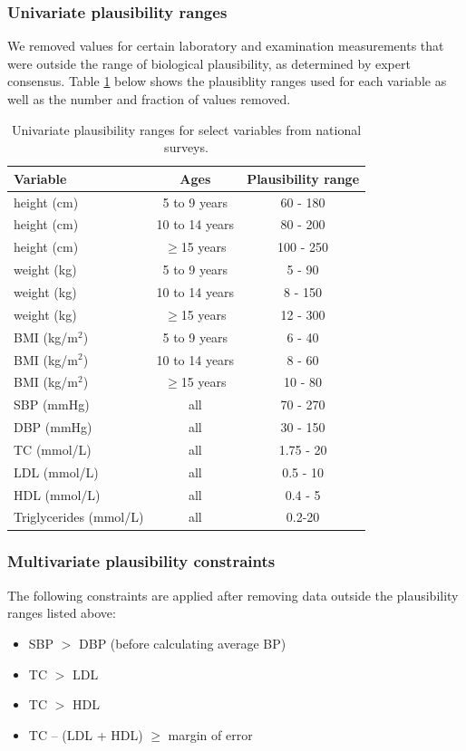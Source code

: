 \documentclass[12pt]{article}
\begin{document}
\begin{appendix}
    \subsubsection{Univariate plausibility ranges}
    We removed values for certain laboratory and examination measurements that were outside the range of biological plausibility, as determined by expert consensus. Table \ref{tab:plausibility} below shows the plausiblity ranges used for each variable as well as the number and fraction of values removed.

    \begin{table}[h]
        \centering
        \caption{Univariate plausibility ranges for select variables from national surveys.}
        \begin{tabular}{lcc}
            \hline
            Variable & Ages & Plausibility range \\
            \hline
            height (cm) & 5 to 9 years & 60 - 180 \\
            height (cm) & 10 to 14 years & 80 - 200 \\
            height (cm) & $\geq$15 years & 100 - 250 \\
            weight (kg) & 5 to 9 years & 5 - 90 \\
            weight (kg) & 10 to 14 years & 8 - 150 \\
            weight (kg) & $\geq$15 years & 12 - 300 \\
            BMI (kg/m$^2$) & 5 to 9 years & 6 - 40 \\
            BMI (kg/m$^2$) & 10 to 14 years & 8 - 60 \\
            BMI (kg/m$^2$) & $\geq$15 years & 10 - 80 \\
            SBP (mmHg) & all & 70 - 270 \\
            DBP (mmHg) & all & 30 - 150 \\
            TC (mmol/L) & all & 1.75 - 20 \\
            LDL (mmol/L) & all & 0.5 - 10 \\
            HDL (mmol/L) & all & 0.4 - 5 \\
            Triglycerides (mmol/L) & all & 0.2-20 \\
            \hline
        \end{tabular}
        \label{tab:plausibility}
    \end{table}

    \subsubsection{Multivariate plausibility constraints}
    The following constraints are applied after removing data outside the plausibility ranges listed above:
    \begin{itemize}
        \item SBP $>$ DBP (before calculating average BP) 
        \item TC $>$ LDL 
        \item TC $>$ HDL
        \item TC – (LDL + HDL) $\geq$ margin of error
    \end{itemize}


\end{appendix}
\end{document}
